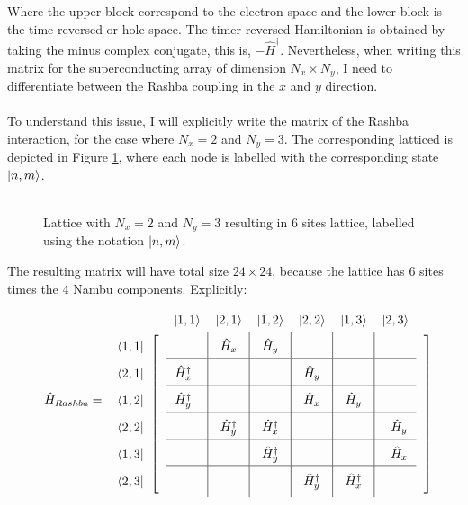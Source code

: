 \documentclass[letterpaper,12pt]{article}
\begin{document}
Where the upper block correspond to the electron space and the lower block is the time-reversed or hole space. The timer reversed Hamiltonian is obtained by taking the minus complex conjugate, this is, $ - \hat{H}^\dagger$. Nevertheless, when writing this matrix for the superconducting array of dimension $N_x \times N_y$, I need to differentiate between the Rashba coupling in the $x$ and $y$ direction.\\ \\
To understand this issue, I will explicitly write the matrix of the Rashba interaction, for the case where $N_x = 2$ and $N_y = 3$. The corresponding latticed is depicted in Figure \ref{diagram}, where each node is labelled with the corresponding state $\ket{n, m}$.\\ \\
\begin{figure}[h!]
\centering
{} 
\label{diagram}
\caption{Lattice with $N_x = 2$ and $N_y = 3$ resulting in 6 sites lattice, labelled using the notation $\ket{n, m}$.}
\end{figure}
\clearpage
The resulting matrix will have total size $24 \times 24$, because the lattice has 6 sites times the 4 Nambu components. Explicitly:
\[
\renewcommand\arraystretch{1.75}
\begin{blockarray}{rccccccccc}
&&& \ket{1, 1} & \ket{2, 1} & \ket{1, 2} & \ket{2, 2} & \ket{1, 3} & \ket{2, 3} &\\
\begin{block}{rc[c@{}c|c|c|c|c|c@{}c]}
  & \bra{1, 1} &&  & \hat{H}_x & \hat{H}_y &  &  & &\vphantom{\smash[b]{\bigg|}} \\
\BAhhline{~~~------~}
  & \bra{2,1} && \hat{H}_x^\dagger &  & & \hat{H}_y  &  & &\\
\BAhhline{~~~------~}
\hat{H}_{Rashba}=\quad
 & \bra{1,2} &&  \hat{H}_y^\dagger  &  &  &  \hat{H}_x &  \hat{H}_y  & &\\
\BAhhline{~~~------~}
  & \bra{2,2} &&  &  \hat{H}_y^\dagger  &  \hat{H}_x^\dagger  &  &   & \hat{H}_y \\
\BAhhline{~~~------~}
 & \bra{1,3} &&  &  &  \hat{H}_y^\dagger &  &  &  \hat{H}_x &\\
 \BAhhline{~~~------~}
  & \bra{2,3} &&  &  &  & \hat{H}_y^\dagger & \hat{H}_x^\dagger  & \vphantom{\smash[t]{\bigg|}} &\\
\end{block}
\end{blockarray}
\]
\end{document}
